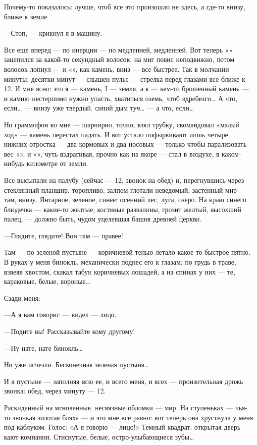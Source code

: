\documentclass[11pt,openany]{book}
\begin{document}
Почему-то показалось: лучше, чтоб все это произошло не здесь, а где-то внизу, ближе к земле.

---Стоп, --- крикнул я в машину.

Все еще вперед --- по инерции --- но медленней, медленней. Вот теперь «» зацепился за какой-то секундный волосок, на миг повис неподвижно, потом волосок лопнул --- и «», как камень, вниз --- все быстрее. Так в молчании минуты, десятки минут --- слышен пульс --- стрелка перед глазами все ближе к 12. И мне ясно: это я --- камень, I --- земля, а я --- кем-то брошенный камень --- и камню нестерпимо нужно упасть, хватиться оземь, чтоб вдребезги\ldots{} А что, если\ldots{} --- внизу уже твердый, синий дым туч\ldots{} --- а что, если\ldots{}

Но граммофон во мне --- шарнирно, точно, взял трубку, скомандовал «малый ход» --- камень перестал падать. И вот устало пофыркивают лишь четыре нижних отростка --- два кормовых и два носовых --- только чтобы парализовать вес «», и «», чуть вздрагивая, прочно как на якоре --- стал в воздухе, в каком-нибудь километре от земли.

Все высыпали на палубу (сейчас --- 12, звонок на обед) и, перегнувшись через стеклянный планшир, торопливо, залпом глотали неведомый, застенный мир --- там, внизу. Янтарное, зеленое, синее: осенний лес, луга, озеро. На краю синего блюдечка --- какие-то желтые, костяные развалины, грозит желтый, высохший палец, --- должно быть, чудом уцелевшая башня древней церкви.

---Глядите, глядите! Вон там --- правее!

Там --- по зеленой пустыне --- коричневой тенью летало какое-то быстрое пятно. В руках у меня бинокль, механически поднес его к глазам: по грудь в траве, взвеяв хвостом, скакал табун коричневых лошадей, а на спинах у них --- те, караковые, белые, вороные\ldots{}

Сзади меня:

---А я вам говорю: --- видел --- лицо.

---Подите вы! Рассказывайте кому другому!

---Ну нате, нате бинокль\ldots{}

Но уже исчезли. Бесконечная зеленая пустыня\ldots{}

И в пустыне --- заполняя всю ее, и всего меня, и всех --- пронзительная дрожь звонка: обед, через минуту --- 12.

Раскиданный на мгновенные, несвязные обломки --- мир. На ступеньках --- чья-то звонкая золотая бляха --- и это мне все равно: вот теперь она хрустнула у меня под каблуком. Голос: «А я говорю --- лицо!» Темный квадрат: открытая дверь кают-компании. Стиснутые, белые, остро-улыбающиеся зубы\ldots{}
\end{document}
